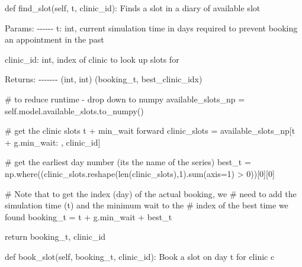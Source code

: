 \documentclass[
  letterpaper,
  DIV=11,
  numbers=noendperiod]{scrreprt}
\newenvironment{Shaded}{}{}
\newcommand{\BuiltInTok}[1]{\textcolor[rgb]{0.84,0.23,0.29}{#1}}
\newcommand{\CommentTok}[1]{\textcolor[rgb]{0.42,0.45,0.49}{#1}}
\newcommand{\ControlFlowTok}[1]{\textcolor[rgb]{0.84,0.23,0.29}{#1}}
\newcommand{\DecValTok}[1]{\textcolor[rgb]{0.00,0.36,0.77}{#1}}
\newcommand{\KeywordTok}[1]{\textcolor[rgb]{0.84,0.23,0.29}{#1}}
\newcommand{\NormalTok}[1]{\textcolor[rgb]{0.14,0.16,0.18}{#1}}
\newcommand{\OperatorTok}[1]{\textcolor[rgb]{0.14,0.16,0.18}{#1}}
\newcommand{\VariableTok}[1]{\textcolor[rgb]{0.89,0.38,0.04}{#1}}
\begin{document}
\begin{tcolorbox}
\begin{Shaded}
\begin{Highlighting}[]
    \KeywordTok{def}\NormalTok{ find\_slot(}\VariableTok{self}\NormalTok{, t, clinic\_id):}
        \CommentTok{\textquotesingle{}\textquotesingle{}\textquotesingle{}}
\CommentTok{        Finds a slot in a diary of available slot}

\CommentTok{        Params:}
\CommentTok{        {-}{-}{-}{-}{-}{-}}
\CommentTok{        t: int,}
\CommentTok{            current simulation time in days}
\CommentTok{            required to prevent booking an appointment}
\CommentTok{            in the past}

\CommentTok{        clinic\_id: int,}
\CommentTok{            index of clinic to look up slots for}

\CommentTok{        Returns:}
\CommentTok{        {-}{-}{-}{-}{-}{-}{-}}
\CommentTok{        (int, int)}
\CommentTok{        (booking\_t, best\_clinic\_idx)}

\CommentTok{        \textquotesingle{}\textquotesingle{}\textquotesingle{}}
        \CommentTok{\# to reduce runtime {-} drop down to numpy}
\NormalTok{        available\_slots\_np }\OperatorTok{=} \VariableTok{self}\NormalTok{.model.available\_slots.to\_numpy()}

        \CommentTok{\# get the clinic slots t + min\_wait forward}
\NormalTok{        clinic\_slots }\OperatorTok{=}\NormalTok{ available\_slots\_np[t }\OperatorTok{+}\NormalTok{ g.min\_wait: , clinic\_id]}

        \CommentTok{\# get the earliest day number (its the name of the series)}
\NormalTok{        best\_t }\OperatorTok{=}\NormalTok{ np.where((clinic\_slots.reshape(}\BuiltInTok{len}\NormalTok{(clinic\_slots),}\DecValTok{1}\NormalTok{).}\BuiltInTok{sum}\NormalTok{(axis}\OperatorTok{=}\DecValTok{1}\NormalTok{) }\OperatorTok{\textgreater{}} \DecValTok{0}\NormalTok{))[}\DecValTok{0}\NormalTok{][}\DecValTok{0}\NormalTok{]}

        \CommentTok{\# Note that to get the index (day) of the actual booking, we}
        \CommentTok{\# need to add the simulation time (t) and the minimum wait to the}
        \CommentTok{\# index of the best time we found}
\NormalTok{        booking\_t }\OperatorTok{=}\NormalTok{ t }\OperatorTok{+}\NormalTok{ g.min\_wait }\OperatorTok{+}\NormalTok{ best\_t}

        \ControlFlowTok{return}\NormalTok{ booking\_t, clinic\_id}


    \KeywordTok{def}\NormalTok{ book\_slot(}\VariableTok{self}\NormalTok{, booking\_t, clinic\_id):}
        \CommentTok{\textquotesingle{}\textquotesingle{}\textquotesingle{}}
\CommentTok{        Book a slot on day t for clinic c}


\end{Highlighting}
\end{Shaded}
\end{tcolorbox}
\end{document}
